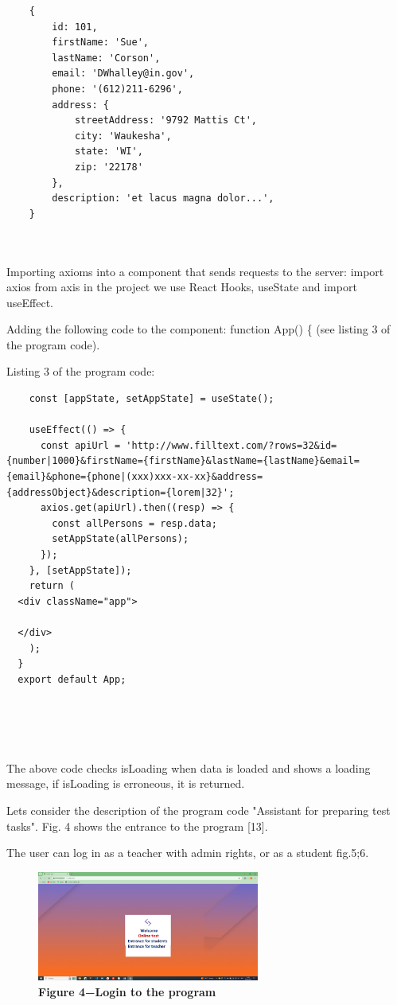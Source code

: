 \begin{lstlisting}
	{
		id: 101,
		firstName: 'Sue',
		lastName: 'Corson',
		email: 'DWhalley@in.gov',
		phone: '(612)211-6296',
		address: {
			streetAddress: '9792 Mattis Ct',
			city: 'Waukesha',
			state: 'WI',
			zip: '22178'
		},
		description: 'et lacus magna dolor...',
	}



\end{lstlisting}

\begin{multicols}{2}


Importing axioms into a component that sends requests to the server:
import axios from \textquotesingle axis\textquotesingle{} in the project
we use React Hooks, useState and import useEffect.

Adding the following code to the component: function App() \{ (see
listing 3 of the program code).

Listing 3 of the program code:
\end{multicols}

\begin{lstlisting}
	const [appState, setAppState] = useState();

	useEffect(() => {
	  const apiUrl = 'http://www.filltext.com/?rows=32&id={number|1000}&firstName={firstName}&lastName={lastName}&email={email}&phone={phone|(xxx)xxx-xx-xx}&address={addressObject}&description={lorem|32}';
	  axios.get(apiUrl).then((resp) => {
		const allPersons = resp.data;
		setAppState(allPersons);
	  });
	}, [setAppState]);
	return (
  <div className="app">
  
  </div>
	);
  }
  export default App;

	
  
  
\end{lstlisting}


\begin{multicols}{2}

The above code checks isLoading when data is loaded and shows a loading
message, if isLoading is erroneous, it is returned.

Let\textquotesingle s consider the description of the program code
"Assistant for preparing test tasks". Fig. 4 shows the entrance to the
program {[}13{]}.

The user can log in as a teacher with admin rights, or as a student fig.5;6.
\end{multicols}


\begin{figure}[H]
	\centering
	\includegraphics[height=0.35\textwidth, width=0.65\textwidth]{assets/129}
	\caption*{\bfseries Figure 4−Login to the program}
\end{figure}


